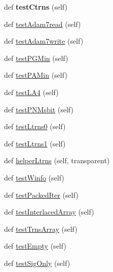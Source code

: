 \begin{DoxyCompactItemize}
def {\bfseries test\+Ctrns} (self)
\item 
def \hyperlink{classpygame_1_1tests_1_1test__utils_1_1png_1_1_test_abfabaf8dc9a8d55b0da21321a142d878}{test\+Adam7read} (self)
\item 
def \hyperlink{classpygame_1_1tests_1_1test__utils_1_1png_1_1_test_ac277ccadb98669897579eeab6d8126ed}{test\+Adam7write} (self)
\item 
def \hyperlink{classpygame_1_1tests_1_1test__utils_1_1png_1_1_test_a1a1ed4beb89e914faf3d4cbc59bfb80d}{test\+P\+G\+Min} (self)
\item 
def \hyperlink{classpygame_1_1tests_1_1test__utils_1_1png_1_1_test_ab0895b096205393cd87abb038e9a6895}{test\+P\+A\+Min} (self)
\item 
def \hyperlink{classpygame_1_1tests_1_1test__utils_1_1png_1_1_test_ac36232c424bc97f7072b9552391534e3}{test\+L\+A4} (self)
\item 
def \hyperlink{classpygame_1_1tests_1_1test__utils_1_1png_1_1_test_a3459cbd4f56bfba3e1a16cdfac32d457}{test\+P\+N\+Msbit} (self)
\item 
def \hyperlink{classpygame_1_1tests_1_1test__utils_1_1png_1_1_test_a5ba2e60055886d7d0c2796dfbfbf45ca}{test\+Ltrns0} (self)
\item 
def \hyperlink{classpygame_1_1tests_1_1test__utils_1_1png_1_1_test_abe31d61257c52f833b73420c02c62a48}{test\+Ltrns1} (self)
\item 
def \hyperlink{classpygame_1_1tests_1_1test__utils_1_1png_1_1_test_a03d42f4ed348c3659d99a2eafb937386}{helper\+Ltrns} (self, transparent)
\item 
def \hyperlink{classpygame_1_1tests_1_1test__utils_1_1png_1_1_test_a03715fabf2188ac3c3bcbbdd6d0dadc6}{test\+Winfo} (self)
\item 
def \hyperlink{classpygame_1_1tests_1_1test__utils_1_1png_1_1_test_a2486b298e979407644f07123a367554d}{test\+Packed\+Iter} (self)
\item 
def \hyperlink{classpygame_1_1tests_1_1test__utils_1_1png_1_1_test_a3e2f01d999db99205e7e44501e85f40a}{test\+Interlaced\+Array} (self)
\item 
def \hyperlink{classpygame_1_1tests_1_1test__utils_1_1png_1_1_test_adde805432c27543413f627b92db212c9}{test\+Trns\+Array} (self)
\item 
def \hyperlink{classpygame_1_1tests_1_1test__utils_1_1png_1_1_test_aa318df36c5822545fe0e65ac40749091}{test\+Empty} (self)
\item 
def \hyperlink{classpygame_1_1tests_1_1test__utils_1_1png_1_1_test_a62f7e9b9a4e56886ae45f503a8329ac2}{test\+Sig\+Only} (self)

\end{DoxyCompactItemize}
